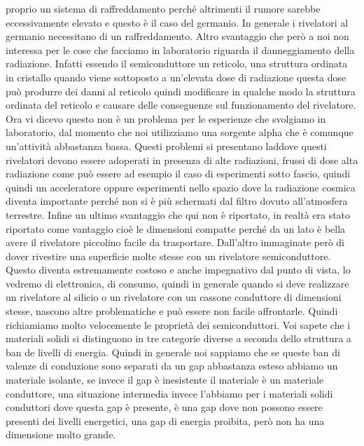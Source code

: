 proprio un sistema di raffreddamento perché altrimenti il rumore sarebbe eccessivamente elevato e questo è il caso del germanio. In generale i rivelatori al germanio necessitano di un raffreddamento. Altro svantaggio che però a noi non interessa per le cose che facciamo in laboratorio riguarda il danneggiamento della radiazione. Infatti essendo il semiconduttore un reticolo, una struttura ordinata in cristallo quando viene sottoposto a un'elevata dose di radiazione questa dose può produrre dei danni al reticolo quindi modificare in qualche modo la struttura ordinata del reticolo e causare delle conseguenze sul funzionamento del rivelatore. Ora vi dicevo questo non è un problema per le esperienze che svolgiamo in laboratorio, dal momento che noi utilizziamo una sorgente alpha che è comunque un'attività abbastanza bassa. Questi problemi si presentano laddove questi rivelatori devono essere adoperati in presenza di alte radiazioni, frussi di dose alta radiazione come può essere ad esempio il caso di esperimenti sotto fascio, quindi quindi un acceleratore oppure esperimenti nello spazio dove la radiazione cosmica diventa importante perché non si è più schermati dal filtro dovuto all'atmosfera terrestre. Infine un ultimo svantaggio che qui non è riportato, in realtà era stato riportato come vantaggio cioè le dimensioni compatte perché da un lato è bella avere il rivelatore piccolino facile da trasportare. Dall'altro immaginate però di dover rivestire una superficie molte stesse con un rivelatore semiconduttore. Questo diventa estremamente costoso e anche impegnativo dal punto di vista, lo vedremo di elettronica, di consumo, quindi in generale quando si deve realizzare un rivelatore al silicio o un rivelatore con un cassone conduttore di dimensioni stesse, nascono altre problematiche e può essere non facile affrontarle. Quindi richiamiamo molto velocemente le proprietà dei semiconduttori. Voi sapete che i materiali solidi si distinguono in tre categorie diverse a seconda dello struttura a ban de livelli di energia. Quindi in generale noi sappiamo che se queste ban di valenze di conduzione sono separati da un gap abbastanza esteso abbiamo un materiale isolante, se invece il gap è inesistente il materiale è un materiale conduttore, una situazione intermedia invece l'abbiamo per i materiali solidi conduttori dove questa gap è presente, è una gap dove non possono essere presenti dei livelli energetici, una gap di energia proibita, però non ha una dimensione molto grande.

